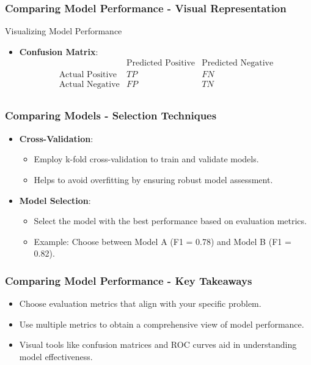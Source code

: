 \documentclass[aspectratio=169]{beamer}
\begin{document}
\begin{frame}[fragile]
    \frametitle{Comparing Model Performance - Visual Representation}
    \begin{block}{Visualizing Model Performance}
        \begin{itemize}
            \item \textbf{Confusion Matrix}:
            \[
            \begin{array}{l|c|c}
                & \text{Predicted Positive} & \text{Predicted Negative} \\
                \hline
                \text{Actual Positive} & TP & FN \\
                \hline
                \text{Actual Negative} & FP & TN \\
            \end{array}
            \]
        \end{itemize}
    \end{block}
\end{frame}

\begin{frame}[fragile]
    \frametitle{Comparing Models - Selection Techniques}
    \begin{itemize}
        \item \textbf{Cross-Validation}:
            \begin{itemize}
                \item Employ k-fold cross-validation to train and validate models.
                \item Helps to avoid overfitting by ensuring robust model assessment.
            \end{itemize}
        
        \item \textbf{Model Selection}:
            \begin{itemize}
                \item Select the model with the best performance based on evaluation metrics.
                \item Example: Choose between Model A (F1 = 0.78) and Model B (F1 = 0.82).
            \end{itemize}
    \end{itemize}
\end{frame}

\begin{frame}[fragile]
    \frametitle{Comparing Model Performance - Key Takeaways}
    \begin{itemize}
        \item Choose evaluation metrics that align with your specific problem.
        \item Use multiple metrics to obtain a comprehensive view of model performance.
        \item Visual tools like confusion matrices and ROC curves aid in understanding model effectiveness.
    \end{itemize}
\end{frame}
\end{document}
